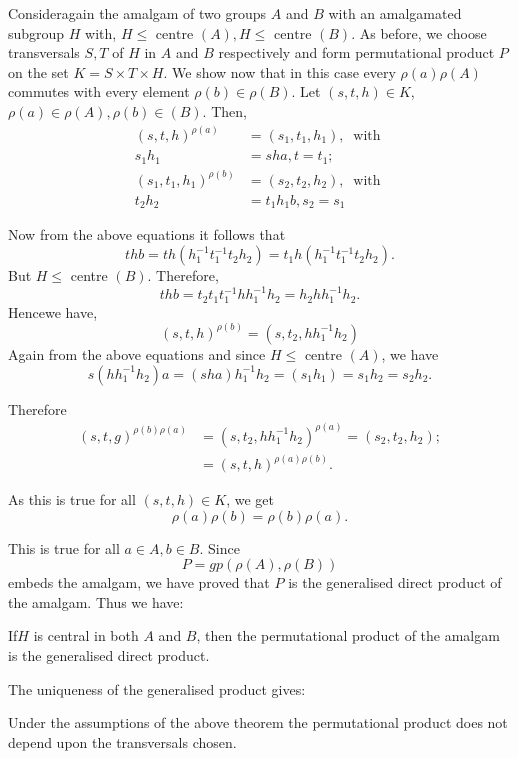 Consider\pageoriginale again the amalgam of two groups $A$ and $B$ with an
amalgamated subgroup $H$ with, $H \leq \text{ centre  }(A),H \leq
\text{ centre }(B)$. As before, we choose transversals $S, T$ of $H$
in $A$ and $B$ respectively and form permutational product $P$ on the
set $K = S \times T \times H$. We show now that in this case every
$\rho (a) \rho (A)$ commutes with every element $\rho (b) \in 
\rho (B)$. Let $(s, t, h)\in  K$,  $\rho (a) \in \rho (A), \rho
(b) \in  (B)$. Then,  
\begin{align*}
  (s, t, h )^{ \rho (a)} & = (s_1,  t_1, h_1), ~\text{ with }\\
  s_1 h_1 & = sha,  t = t_1 ; \\
  (s_1,  t_1,  h_1)^{ \rho (b)}  & = (s_2, t_2, h_2), ~\text{ with }\\
  t_2 h_2 & = t _1 h_1 b , s_2=s_1 
\end{align*}

Now from the above equations it follows that 
$$
thb = th (h_1^{-1} t_1^{ -1}t_2 h_2) = t_1 h (h^{-1}_1 t^{-1}_1 t_2  h_2). 
$$
But $H \leq$ centre $(B)$. Therefore, 
$$
thb = t_2 t_1 t_1 ^{-1} hh_1^{-1} h_2 = h_2 hh^{-1}_1 h_2. 
$$
Hence\pageoriginale we have, 
$$
(s, t,  h)^{\rho (b)} = (s,  t_2,  hh_1^{-1} h_2 )
$$
Again from the above equations and since $H \leq $ centre $(A)$, we have 
$$
s (hh^{-1}_1 h_2 ) a = ( sha ) h_1^{-1} h_2 = (s_1 h_1 ) = s_1 h_2 = s_2 h_2. 
$$

Therefore
\begin{align*}
  (s, t, g) ^{\rho (b) \rho (a)} & = (s, t _2,  hh^{-1}_1 h_2)^{\rho
    (a) }= (s_2,  t_2,  h_2) ; \\ 
  &= (s, t, h)^{\rho (a) \rho (b)}. 
\end{align*}

As this is true for all $(s, t, h)\in  K$, we get 
$$
\rho (a) \rho (b) = \rho (b) \rho (a). 
$$

This is true for all $a \in  A, b \in  B$. Since 
$$
P = gp(\rho (A), \rho (B))
$$
embeds the amalgam, we have proved that $P$ is the generalised direct
product of the amalgam. Thus we have:  
\begin{theorem}\label{chap10:sec3:thm2} %
  If\pageoriginale $H$ is central in both $A$ and $B$, then the permutational
  product of the amalgam is the generalised direct product.  
 \end{theorem}
 
The uniqueness of the generalised product gives:
\begin{coro*}
  Under the assumptions of the above theorem the permutational product
  does not depend upon the transversals chosen. 
\end{coro*} 
 
